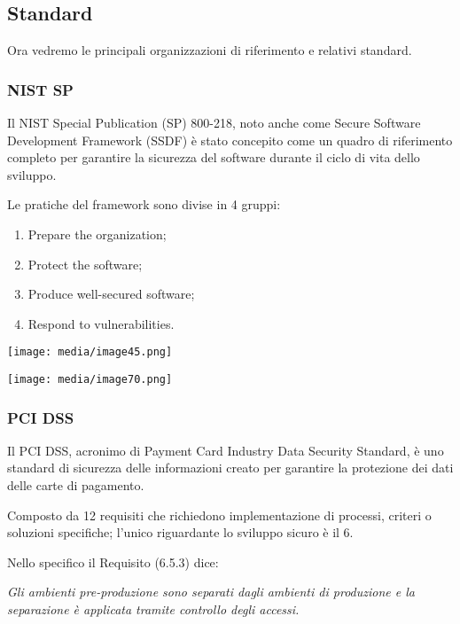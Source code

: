 \subsection{Standard}\label{standard-1}

Ora vedremo le principali organizzazioni di riferimento e relativi
standard.

\subsubsection{\texorpdfstring{NIST SP }{NIST SP }}\label{nist-sp}

Il NIST Special Publication (SP) 800-218, noto anche come Secure
Software Development Framework (SSDF) è stato concepito come un quadro
di riferimento completo per garantire la sicurezza del software durante
il ciclo di vita dello sviluppo.

Le pratiche del framework sono divise in 4 gruppi:

\begin{enumerate}
\def\labelenumi{\arabic{enumi}.}
\item
  Prepare the organization;
\item
  Protect the software;
\item
  Produce well-secured software;
\item
  Respond to vulnerabilities.
\end{enumerate}

\texttt{[image: media/image45.png]}

\texttt{[image: media/image70.png]}

\subsubsection{PCI DSS}\label{pci-dss-1}

Il PCI DSS, acronimo di Payment Card Industry Data Security Standard, è
uno standard di sicurezza delle informazioni creato per garantire la
protezione dei dati delle carte di pagamento.

Composto da 12 requisiti che richiedono implementazione di processi,
criteri o soluzioni specifiche; l'unico riguardante lo sviluppo sicuro è
il 6.

Nello specifico il Requisito (6.5.3) dice:

\emph{Gli ambienti pre-produzione sono separati dagli ambienti di
produzione e la separazione è applicata tramite controllo degli
accessi.}

